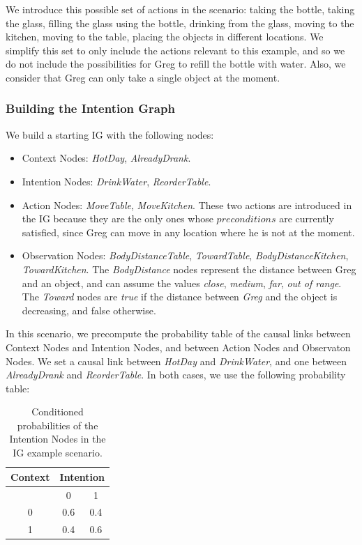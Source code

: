 We introduce this possible set of actions in the scenario: taking the bottle, taking the glass, filling the glass using the bottle, drinking from the glass, moving to the kitchen, moving to the table, placing the objects in different locations. We simplify this set to only include the actions relevant to this example, and so we do not include the possibilities for Greg to refill the bottle with water. Also, we consider that Greg can only take a single object at the moment. 

\subsubsection{Building the Intention Graph}

We build a starting IG with the following nodes:
\begin{itemize}
	\item Context Nodes: \textit{HotDay}, \textit{AlreadyDrank}.
	\item Intention Nodes: \textit{DrinkWater}, \textit{ReorderTable}.
	\item Action Nodes: \textit{MoveTable}, \textit{MoveKitchen}. These two actions are introduced in the IG because they are the only ones whose $preconditions$ are currently satisfied, since Greg can move in any location where he is not at the moment.
	\item Observation Nodes: \textit{BodyDistanceTable}, \textit{TowardTable}, \textit{BodyDistanceKitchen}, \textit{TowardKitchen}. The \textit{BodyDistance} nodes represent the distance between Greg and an object, and can assume the values \textit{close}, \textit{medium}, \textit{far}, \textit{out of range}. The \textit{Toward} nodes are \textit{true} if the distance between \textit{Greg} and the object is decreasing, and false otherwise.
\end{itemize}


In this scenario, we precompute the probability table of the causal links between Context Nodes and Intention Nodes, and between Action Nodes and Observaton Nodes. We set a causal link between \textit{HotDay} and \textit{DrinkWater}, and one between \textit{AlreadyDrank} and \textit{ReorderTable}. In both cases, we use the following probability table:

 \begin{table}[h!]
\centering
\begin{tabular}{|c|c|c|}
\hline
Context & \multicolumn{2}{|c|}{Intention} \\ \hline \hline
& 0 & 1 \\ \hline
0  & 0.6 & 0.4 \\ \hline
1 & 0.4 & 0.6 \\ \hline
\end{tabular}
\caption[Belief models in the IG scenario]{Conditioned probabilities of the Intention Nodes in the IG example scenario.}
 \label{table:situation_assessment-ig_intention}    
\end{table}

